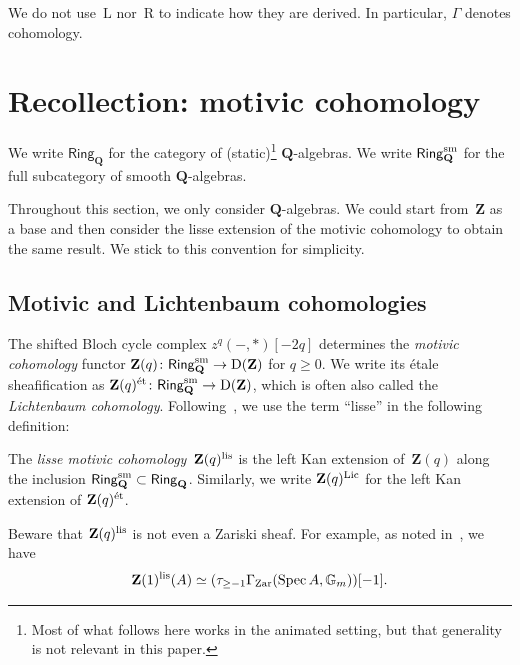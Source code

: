 \documentclass[11pt,a4paper]{amsart}
\numberwithin{equation}{section}
\theoremstyle{plain}
\theoremstyle{definition}
\theoremstyle{remark}
\newcommand{\ZZ}{\mathbf{Z}}
\newcommand{\QQ}{\mathbf{Q}}
\newcommand{\GG}{\mathbb{G}}
\newcommand{\Lic}{\textnormal{Lic}}
\newcommand{\Zar}{\textnormal{Zar}}
\newcommand{\et}{\textnormal{ét}}
\newcommand{\lis}{\textnormal{lis}}
\newcommand{\sm}{\textnormal{sm}}
\newcommand{\D}{\operatorname{D}}
\newcommand{\Spec}{\operatorname{Spec}}
\newcommand{\X}{\mathord{-}}
\newcommand{\Cat}[1]{\mathsf{#1}}
\begin{document}
We do not use~$\mathrm{L}$ nor~$\mathrm{R}$
to indicate how they are derived.
In particular,
\(\Gamma\) denotes cohomology.

\section{Recollection: motivic cohomology}\label{s:motivic}

We write \(\Cat{Ring}_{\QQ}\)
for the category of (static)\footnote{Most of what follows here works
  in the animated setting,
  but that generality is not relevant
  in this paper.
} \(\QQ\)-algebras.
We write \(\Cat{Ring}_{\QQ}^{\sm}\)
for the full subcategory of smooth \(\QQ\)-algebras.

\begin{remark}\label{xi4u0d}
  Throughout this section,
  we only consider \(\QQ\)-algebras.
  We could start from~\(\ZZ\) as a base
  and then consider the lisse extension
  of the motivic cohomology
  to obtain the same result.
  We stick to this convention for simplicity.
\end{remark}

\subsection{Motivic and Lichtenbaum cohomologies}

The shifted Bloch cycle complex \(z^{q}(\X,{*})[-2q]\)
determines
the \emph{motivic cohomology} functor
\(\ZZ(q)\colon\Cat{Ring}_{\QQ}^{\sm}\to\D(\ZZ)\)
for \(q\geq0\).
We write its étale sheafification
as \(\ZZ(q)^{\et}\colon\Cat{Ring}_{\QQ}^{\sm}\to\D(\ZZ)\),
which is often also called the \emph{Lichtenbaum cohomology}.
Following~\cite{ElmantoMorrow},
we use the term “lisse” in the following definition:

\begin{definition}\label{lisse}
  The \emph{lisse motivic cohomology}~\(\ZZ(q)^{\lis}\)
  is the left Kan extension
  of~\(\ZZ(q)\)
  along the inclusion
  \(\Cat{Ring}_{\QQ}^{\sm}\subset\Cat{Ring}_{\QQ}\).
  Similarly, we write \(\ZZ(q)^{\Lic}\)
  for the left Kan extension of \(\ZZ(q)^{\et}\).
\end{definition}

\begin{remark}\label{xc6217}
  Beware that \(\ZZ(q)^{\lis}\)
  is not even a Zariski sheaf.
  For example,
  as noted in~\cite[Example~3.2]{ElmantoMorrow},
  we have
  \begin{equation}\label{e:weight-one}
    \ZZ(1)^{\lis}(A)
    \simeq
    (\tau_{\geq-1}\Gamma_{\Zar}(\Spec A,\GG_m))[-1].
  \end{equation}
\end{remark}
\end{document}

